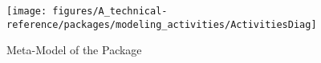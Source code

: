 %
%

\begin{figure}[htbp]
  \centering
  \texttt{[image: figures/A\_technical-reference/packages/modeling\_activities/ActivitiesDiag]}
  \caption{Meta-Model of the  Package}
  \label{fig:MM:activities}
\end{figure}
